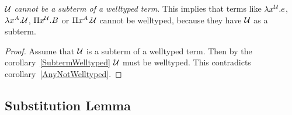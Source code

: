 \begin{corollary}
    \label{AnyNoSubterm}
    \emph{${\cal U}$ cannot be a subterm of a welltyped term}. This implies that
    terms like $\lambda x^{\cal U}. e$, $\lambda x^A. {\cal U}$, $\Pi x^{\cal U}. B$ or $\Pi
    x^A. {\cal U}$ cannot be welltyped, because they have ${\cal U}$ as a subterm.

    \begin{proof}
        Assume that ${\cal U}$ is a subterm of a welltyped term. Then by the
        corollary~\ref{SubtermWelltyped} ${\cal U}$ must be welltyped. This
        contradicts corollary~\ref{AnyNotWelltyped}.
    \end{proof}
\end{corollary}



\subsection{Substitution Lemma}


